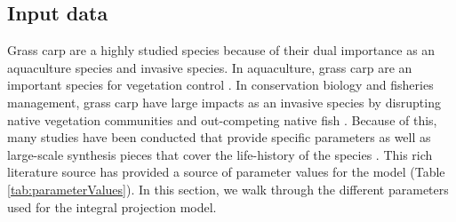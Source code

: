 \documentclass{article}[12pt]
\begin{document}
\subsection{Input data}\label{sec:Input}

Grass carp are a highly studied species because of their dual importance as an aquaculture species and invasive species.
In aquaculture, grass carp are an important species for vegetation control \citep{chilton1992biology}. 
In conservation biology and fisheries management, grass carp have large impacts as an invasive species by disrupting native vegetation communities and out-competing native fish \citep{chapman2013first, wittmann2014grass}. 
Because of this, many studies have been conducted that provide specific parameters as well as large-scale synthesis pieces that cover the life-history of the species \citep[e.g.,][]{shireman1983synopsis}.
This rich literature source has provided a source of parameter values for the model (Table \ref{tab:parameterValues}).
In this section, we walk through the different parameters used for the integral projection model.
\end{document}
